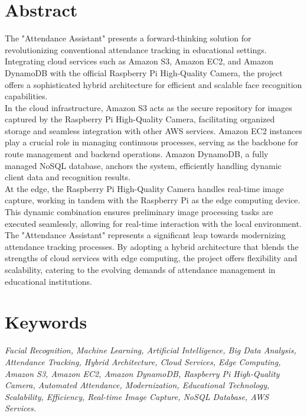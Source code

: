\documentclass[11pt]{article}
\begin{document}
\tableofcontents
\thispagestyle{empty}
\clearpage

\setcounter{page}{1}

\section{Abstract}
The "Attendance Assistant" presents a forward-thinking solution for revolutionizing conventional attendance tracking in educational settings. Integrating cloud services such as Amazon S3, Amazon EC2, and Amazon DynamoDB with the official Raspberry Pi High-Quality Camera, the project offers a sophisticated hybrid architecture for efficient and scalable face recognition capabilities.\\

In the cloud infrastructure, Amazon S3 acts as the secure repository for images captured by the Raspberry Pi High-Quality Camera, facilitating organized storage and seamless integration with other AWS services. Amazon EC2 instances play a crucial role in managing continuous processes, serving as the backbone for route management and backend operations. Amazon DynamoDB, a fully managed NoSQL database, anchors the system, efficiently handling dynamic client data and recognition results.\\

At the edge, the Raspberry Pi High-Quality Camera handles real-time image capture, working in tandem with the Raspberry Pi as the edge computing device. This dynamic combination ensures preliminary image processing tasks are executed seamlessly, allowing for real-time interaction with the local environment.\\

The "Attendance Assistant" represents a significant leap towards modernizing attendance tracking processes. By adopting a hybrid architecture that blends the strengths of cloud services with edge computing, the project offers flexibility and scalability, catering to the evolving demands of attendance management in educational institutions.
\section{Keywords}
\textit{Facial Recognition, Machine Learning, Artificial Intelligence, Big Data Analysis, Attendance Tracking, Hybrid Architecture, Cloud Services, Edge Computing, Amazon S3, Amazon EC2, Amazon DynamoDB, Raspberry Pi High-Quality Camera, Automated Attendance, Modernization, Educational Technology, Scalability, Efficiency, Real-time Image Capture, NoSQL Database, AWS Services.}
\end{document}
